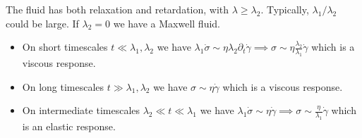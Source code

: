 \documentclass{jknotes}
\newcommand{\srate}{\dot{\gamma}}
\begin{document}
The fluid has both relaxation and retardation, with $\lambda \ge \lambda_2$.
Typically, $\lambda_1/\lambda_2$ could be large. If $\lambda_2 = 0$ we have a
Maxwell fluid.

\begin{itemize}
	 \item On short timescales $t \ll \lambda_1, \lambda_2$ we have $\lambda_1
		 \dot{\sigma} \sim \eta \lambda_2 \partial_t \srate \implies \sigma
		 \sim \eta\frac{\lambda_2}{\lambda_1} \srate$ which is a viscous
		 response.
	\item On long timescales $t \gg \lambda_1, \lambda_2$ we have $\sigma \sim
		\eta \srate$ which is a viscous response.
	\item On intermediate timescales $\lambda_2 \ll t \ll \lambda_1$ we have
		$\lambda_1 \dot{\sigma} \sim \eta \srate \implies \sigma \sim
		\frac{\eta}{\lambda_1} \srate$ which is an elastic response.
\end{itemize}
\end{document}
